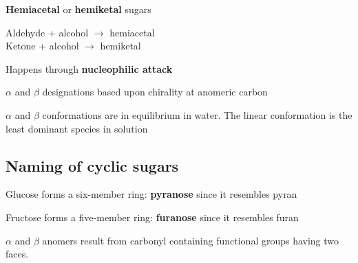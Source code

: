 \documentclass[letterpaper, 12pt]{article}
\begin{document}
\textbf{Hemiacetal} or \textbf{hemiketal} sugars

Aldehyde + alcohol $\to$ hemiacetal \\
Ketone + alcohol $\to$ hemiketal

Happens through \textbf{nucleophilic attack}

$\alpha$ and $\beta$ designations based upon chirality at anomeric carbon

$\alpha$ and $\beta$ conformations are in equilibrium in water. The linear conformation is the least dominant species in solution

\subsection*{Naming of cyclic sugars}
Glucose forms a six-member ring: \textbf{pyranose} since it resembles pyran

Fructose forms a five-member ring: \textbf{furanose} since it resembles furan

$\alpha$ and $\beta$ anomers result from carbonyl containing functional groups having two faces.
\end{document}
